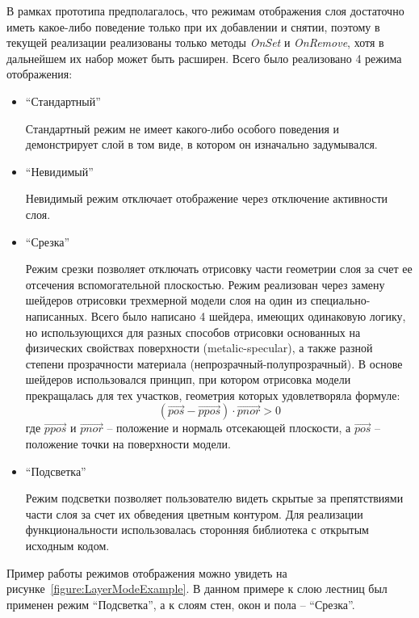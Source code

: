 В рамках прототипа предполагалось, что режимам отображения слоя
достаточно иметь какое-либо поведение только при их добавлении и снятии,
поэтому в текущей реализации реализованы только методы
\emph{OnSet} и \emph{OnRemove}, хотя в дальнейшем
их набор может быть расширен. Всего было реализовано 4 режима отображения:

\begin{itemize}
    \item {
        ``Стандартный''

        Стандартный режим не имеет какого-либо особого поведения и
        демонстрирует слой в том виде, в котором он изначально задумывался.
    }
    \item {
        ``Невидимый''

        Невидимый режим отключает отображение через отключение активности слоя.
    }
    \item {
        ``Срезка''

        Режим срезки позволяет отключать отрисовку части геометрии слоя
        за счет ее отсечения вспомогательной плоскостью.
        Режим реализован через замену шейдеров отрисовки трехмерной
        модели слоя на один из специально-написанных.
        Всего было написано 4 шейдера, имеющих одинаковую логику,
        но использующихся для разных способов отрисовки основанных на физических
        свойствах поверхности (metalic-specular\cite{DocUnity}),
        а также разной степени прозрачности материала (непрозрачный-полупрозрачный).
        В основе шейдеров использовался принцип,
        при котором отрисовка модели прекращалась для тех участков,
        геометрия которых удовлетворяла формуле:
        \[
            ( \vec{pos} - \vec{ppos} ) \cdot
            \vec{pnor} > 0
        \]
        где $\vec{ppos}$ и $\vec{pnor}$ --
        положение и нормаль отсекающей плоскости,
        а $\vec{pos}$ -- положение точки на поверхности модели.%
        \cite{UnityCrossSection}
    }
    \item {
        ``Подсветка''

        Режим подсветки позволяет пользователю видеть скрытые за препятствиями
        части слоя за счет их обведения цветным контуром.
        Для реализации функциональности использовалась сторонняя библиотека
        с открытым исходным кодом.\cite{UnityFxOutline}
    }
\end{itemize}

Пример работы режимов отображения можно увидеть на рисунке~\ref{figure:LayerModeExample}.
В данном примере к слою лестниц был применен режим ``Подсветка'',
а к слоям стен, окон и пола -- ``Срезка''.

